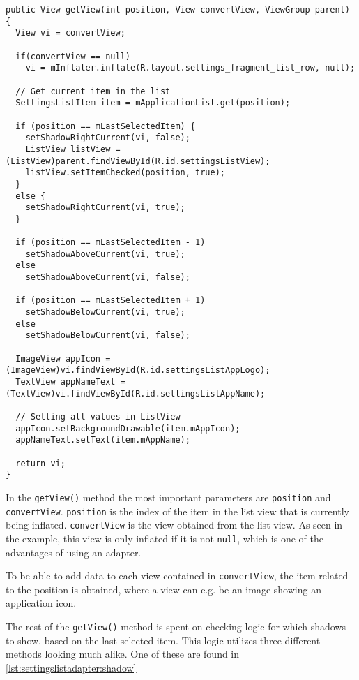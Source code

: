 \begin{lstlisting}[caption={\lstinline|getView()| method in \lstinline|SettingsListAdapter| class.}, label={lst:settingslistadapter:getview}]
public View getView(int position, View convertView, ViewGroup parent) {
  View vi = convertView;
  
  if(convertView == null)
    vi = mInflater.inflate(R.layout.settings_fragment_list_row, null);
  
  // Get current item in the list
  SettingsListItem item = mApplicationList.get(position);
  
  if (position == mLastSelectedItem) {
    setShadowRightCurrent(vi, false);
    ListView listView = (ListView)parent.findViewById(R.id.settingsListView);
    listView.setItemChecked(position, true);
  }
  else {
    setShadowRightCurrent(vi, true);
  }
  
  if (position == mLastSelectedItem - 1)
    setShadowAboveCurrent(vi, true);
  else
    setShadowAboveCurrent(vi, false);
  
  if (position == mLastSelectedItem + 1)
    setShadowBelowCurrent(vi, true);
  else
    setShadowBelowCurrent(vi, false);
  
  ImageView appIcon = (ImageView)vi.findViewById(R.id.settingsListAppLogo);
  TextView appNameText = (TextView)vi.findViewById(R.id.settingsListAppName);
  
  // Setting all values in ListView
  appIcon.setBackgroundDrawable(item.mAppIcon);
  appNameText.setText(item.mAppName);
  
  return vi;
}
\end{lstlisting}

In the \lstinline|getView()| method the most important parameters are \lstinline|position| and \lstinline|convertView|.
\lstinline|position| is the index of the item in the list view that is currently being inflated.
\lstinline|convertView| is the view obtained from the list view.
As seen in the example, this view is only inflated if it is not \lstinline|null|, which is one of the advantages of using an adapter.

To be able to add data to each view contained in \lstinline|convertView|, the item related to the position is obtained, where a view can e.g. be an image showing an application icon.

The rest of the \lstinline|getView()| method is spent on checking logic for which shadows to show, based on the last selected item.
This logic utilizes three different methods looking much alike.
One of these are found in \cref{lst:settingslistadapter:shadow}

